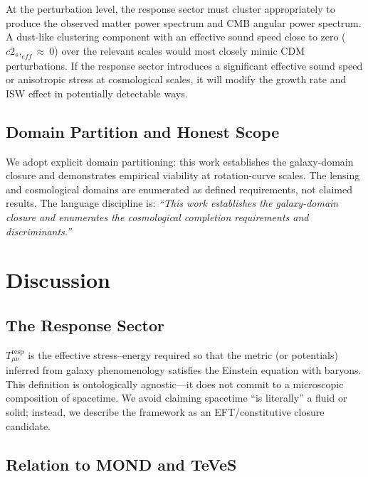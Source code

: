 \documentclass[11pt]{article}
\begin{document}
At the perturbation level, the response sector must cluster appropriately to produce the observed matter power spectrum and CMB angular power spectrum. A dust-like clustering component with an effective sound speed close to zero (\(c2_{s},_{eff} \approx \ 0\)) over the relevant scales would most closely mimic CDM perturbations. If the response sector introduces a significant effective sound speed or anisotropic stress at cosmological scales, it will modify the growth rate and ISW effect in potentially detectable ways.

\subsection{Domain Partition and Honest Scope}\label{domain-partition-and-honest-scope}

We adopt explicit domain partitioning: this work establishes the galaxy-domain closure and demonstrates empirical viability at rotation-curve scales. The lensing and cosmological domains are enumerated as defined requirements, not claimed results. The language discipline is: \emph{``This work establishes the galaxy-domain closure and enumerates the cosmological completion requirements and discriminants.''}


\section{Discussion}\label{discussion}

\subsection{The Response Sector}\label{the-response-sector}

\(T_{\mu\nu}^{\text{resp}}\) is the effective stress--energy required so that the metric (or potentials) inferred from galaxy phenomenology satisfies the Einstein equation with baryons. This definition is ontologically agnostic---it does not commit to a microscopic composition of spacetime. We avoid claiming spacetime ``is literally'' a fluid or solid; instead, we describe the framework as an EFT/constitutive closure candidate.

\subsection{Relation to MOND and TeVeS}\label{relation-to-mond-and-teves}
\end{document}
